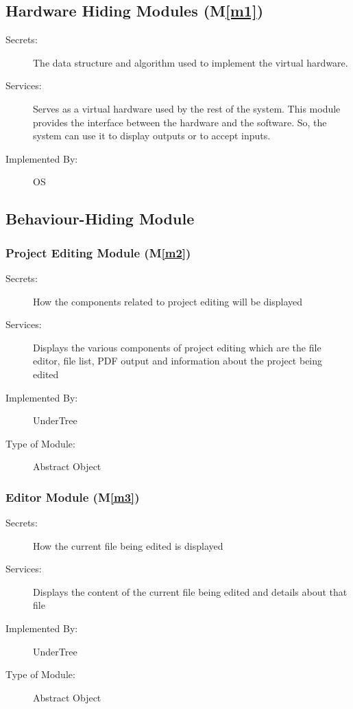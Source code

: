 \documentclass[12pt, titlepage]{article}
\newcommand{\mref}[1]{M\ref{#1}}
\begin{document}
	\subsection{Hardware Hiding Modules (\mref{m1})}
	
	\begin{description}
		\item[Secrets:]The data structure and algorithm used to implement the virtual hardware.
		\item[Services:]Serves as a virtual hardware used by the rest of the
		system. This module provides the interface between the hardware and the
		software. So, the system can use it to display outputs or to accept inputs.
		\item[Implemented By:] OS
	\end{description}
	
	\subsection{Behaviour-Hiding Module}
	
	
	\subsubsection{Project Editing Module (\mref{m2})}
	
	\begin{description}
		\item[Secrets:] How the components related to project editing will be displayed
		\item[Services:] Displays the various components of project editing which are the file editor, file list, PDF output and information about the project being edited
		\item[Implemented By:] UnderTree
		\item[Type of Module:] Abstract Object
	\end{description}
	
	\subsubsection{Editor Module (\mref{m3})}
	
	\begin{description}
		\item[Secrets:] How the current file being edited is displayed
		\item[Services:] Displays the content of the current file being edited and details about that file
		\item[Implemented By:] UnderTree
		\item[Type of Module:] Abstract Object
	\end{description}
	
\end{document}
